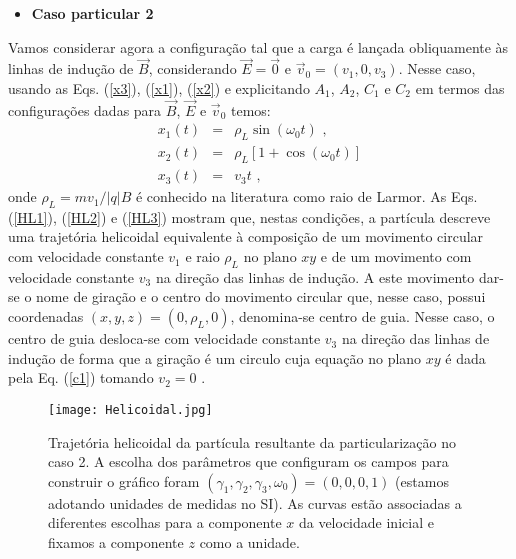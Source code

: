 \documentclass[twocolumn]{rbef}
\newcommand{\1}{\mathbbm{1}}
\begin{document}
\begin{itemize}
\item \textbf{Caso particular 2}
\end{itemize}

Vamos considerar agora a configuração tal que a carga é lançada
obliquamente às linhas de indução de $\vec{B}$, considerando
$\vec{E}=\vec{0}$ e $\vec{v}_{0} = (v_{1},0,v_{3})$. Nesse caso, usando
as Eqs. (\ref{x3}), (\ref{x1}), (\ref{x2}) e explicitando $A_{1}$,
$A_{2}$, $C_{1}$ e $C_{2}$ em termos das configurações dadas para
$\vec{B}$, $\vec{E}$ e $\vec{v}_{0}$ temos:
\begin{eqnarray}
  x_{1}\left( t\right)  &=& \rho_{L} \sin \left(
                            \omega_{0} t\right)  \label{HL1} \text{ ,} \\
  x_{2}\left( t\right)  &=& \rho_{L} \left[ 1 + \cos \left(
                            \omega_{0} t\right) \right]   \label{HL2}\\
  x_{3}\left( t\right) &=& v_{3} t \text{ ,} \label{HL3}
\end{eqnarray}%
onde $\rho_{L} = m v_{1} / \vert q \vert B$ é conhecido na literatura
como raio de Larmor. As Eqs. (\ref{HL1}), (\ref{HL2}) e (\ref{HL3})
mostram que, nestas condições, a partícula descreve uma trajetória
helicoidal equivalente à composição de um movimento circular com
velocidade constante %
$v_{1}$ e raio $\rho_{L}$ no plano
$xy$ e de um movimento com velocidade constante %
$v_{3}$ na direção das linhas de indução. A este movimento dar-se o nome
de giração e o centro do movimento circular que, nesse caso, possui
coordenadas $(x,y,z)=(0,\rho_{L},0)$, denomina-se centro de guia. Nesse
caso, o centro de guia desloca-se com velocidade constante $v_{3}$ na
direção das linhas de indução de forma que a giração é um circulo cuja
equação no plano $xy$ é dada pela Eq. (\ref{c1}) tomando $v_{2}=0$
\cite{Viana}.

\begin{figure}[!htb]
  \centering \texttt{[image: Helicoidal.jpg]}
  \caption{Trajetória helicoidal da partícula resultante da
    particularização no caso 2. A escolha dos parâmetros que configuram
    os campos para construir o gráfico foram
    $(\gamma_1,\gamma_2,\gamma_3,\omega_0)=(0,0,0,1)$ (estamos adotando
    unidades de medidas no SI). As curvas estão associadas a diferentes
    escolhas para a componente $x$ da velocidade inicial e fixamos a
    componente $z$ como a unidade.}
  \label{helicoidal}
\end{figure}
\end{document}
